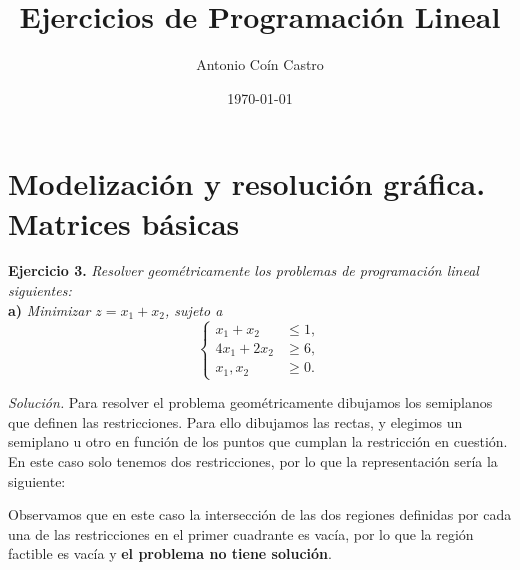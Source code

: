 \documentclass[11pt,a4paper]{article}
\title{Ejercicios de Programación Lineal\\}
\author{Antonio Coín Castro}
\date{\today}
\begin{document}
\maketitle

\section{Modelización y resolución gráfica. Matrices básicas}

\textbf{Ejercicio 3. }\emph{Resolver geométricamente los problemas de programación lineal siguientes:}\\

\textbf{a)} \emph{Minimizar \( z= x_{1} + x_{2} \), sujeto a}
\[
\begin{cases}
  x_{1} + x_{2} &\leq 1,\\
  4x_{1} + 2x_{2} &\geq 6,\\
  x_{1}, x_{2} &\geq 0.
\end{cases}
\]

\textit{Solución.} Para resolver el problema geométricamente dibujamos los semiplanos que definen las restricciones. Para ello dibujamos las rectas, y elegimos un semiplano u otro en función de los puntos que cumplan la restricción en cuestión. En este caso solo tenemos dos restricciones, por lo que la representación sería la siguiente:

\begin{figure}[h!]
\centering
{}
\end{figure}

Observamos que en este caso la intersección de las dos regiones definidas por cada una de las restricciones en el primer cuadrante es vacía, por lo que la región factible es vacía y \textbf{el problema no tiene solución}.\\
\end{document}
